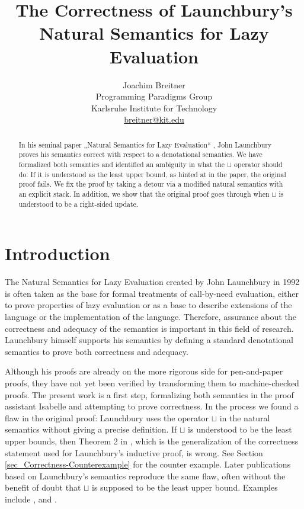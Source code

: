 \documentclass[11pt,a4paper,parskip=half]{scrartcl}
\begin{document}
\title{The Correctness of Launchbury's Natural Semantics for Lazy Evaluation}
\author{Joachim Breitner\\
Programming Paradigms Group\\
Karlsruhe Institute for Technology\\
\url{breitner@kit.edu}}
\maketitle

\begin{abstract}
In his seminal paper „Natural Semantics for Lazy Evaluation“ \cite{launchbury},
John Launchbury proves his semantics correct with respect to a denotational
semantics. We have formalized both semantics and identified an ambiguity in
what the $\sqcup$ operator should do: If it is understood as the least upper
bound, as hinted at in the paper, the original proof fails.  We fix the proof
by taking a detour via a modified natural semantics with an explicit stack. In
addition, we show that the original proof goes through when $\sqcup$ is
understood to be a right-sided update.
\end{abstract}

\tableofcontents

\section{Introduction}

The Natural Semantics for Lazy Evaluation \cite{launchbury} created by John Launchbury in 1992 is often taken as the base for formal treatments of call-by-need evaluation, either to prove properties of lazy evaluation or as a base to describe extensions of the language or the implementation of the language. Therefore, assurance about the correctness and adequacy of the semantics is important in this field of research. Launchbury himself supports his semantics by defining a standard denotational semantics to prove both correctness and adequacy.

Although his proofs are already on the more rigorous side for pen-and-paper proofs, they have not yet been verified by transforming them to machine-checked proofs. The present work is a first step, formalizing both semantics in the proof assistant Isabelle and attempting to prove correctness. In the process we found a flaw in the original proof: Launchbury uses the operator $\sqcup$ in the natural semantics without giving a precise definition. If $\sqcup$ is understood to be the least upper bounds, then Theorem 2 in \cite{launchbury}, which is the generalization of the correctness statement used for Launchbury's inductive proof, is wrong. See Section \ref{sec_Correctness-Counterexample} for the counter example. Later publications based on Launchbury’s semantics reproduce the same flaw, often without the benefit of doubt that $\sqcup$ is supposed to be the least upper bound. Examples include \cite{nakata_extended}%
, \cite{distributed} and \cite{mixed}. 
\end{document}
